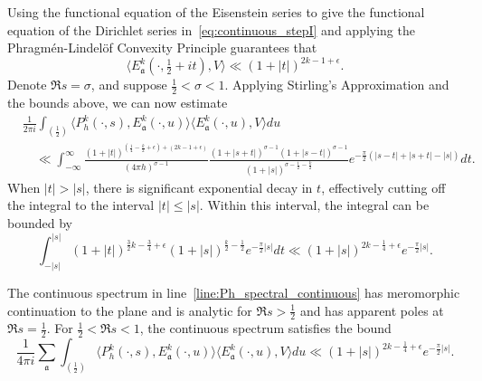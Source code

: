 Using the functional equation of the Eisenstein series to give the functional equation of
the Dirichlet series in~\eqref{eq:continuous_stepI} and applying the Phragm\'en-Lindel\"of
Convexity Principle guarantees that
\begin{equation}
  \langle E_\mathfrak{a}^k(\cdot, \tfrac{1}{2} + it), V \rangle \ll (1 + \lvert t
  \rvert)^{2k - 1 + \epsilon}.
\end{equation}
Denote $\Re s = \sigma$, and suppose $\tfrac{1}{2} < \sigma < 1$.
Applying Stirling's Approximation and the bounds above, we can now estimate
\begin{align}
  &\frac{1}{2\pi i} \int_{(\frac{1}{2})} \langle P_h^k(\cdot, s),
E^k_{\mathfrak{a}}(\cdot, u) \rangle \langle E^k_{\mathfrak{a}}(\cdot, u), V \rangle du \\
  &\quad \ll \int_{-\infty}^\infty
  \frac{(1 + \lvert t \rvert)^{(\frac{1}{4} - \frac{k}{2} + \epsilon) + (2k - 1 +
  \epsilon)}}{(4\pi h)^{\sigma - 1}}
  \frac{(1 + \lvert s + t \rvert)^{\sigma - 1} (1 + \lvert s - t \rvert)^{\sigma - 1}}{(1
  + \lvert s \rvert)^{\sigma - \frac{1}{2} - \frac{k}{2}}}
  e^{-\frac{\pi}{2}(\lvert s - t \rvert + \lvert s + t \rvert - \lvert s \rvert)}dt.
\end{align}
When $\lvert t \rvert > \lvert s \rvert$, there is significant exponential decay in $t$,
effectively cutting off the integral to the interval $\lvert t \rvert \leq \lvert s
\rvert$.
Within this interval, the integral can be bounded by
\begin{equation}
  \int_{-\lvert s \rvert}^{\lvert s \rvert} (1 + \lvert t \rvert)^{\frac{3}{2}k -
  \frac{3}{4} + \epsilon} (1 + \lvert s \rvert)^{\frac{k}{2} - \frac{1}{2}}
  e^{-\frac{\pi}{2}\lvert s \rvert} dt \ll (1 + \lvert s \rvert)^{2k - \frac{1}{4} +
  \epsilon} e^{-\frac{\pi}{2}\lvert s \rvert}.
\end{equation}


\begin{proposition}\label{prop:hyperboloid_continuous_props}
  The continuous spectrum in line~\eqref{line:Ph_spectral_continuous} has meromorphic
  continuation to the plane and is analytic for $\Re s > \frac{1}{2}$ and has apparent
  poles at $\Re s = \frac{1}{2}$.
  For $\frac{1}{2} < \Re s < 1$, the continuous spectrum satisfies the bound
  \begin{equation}
    \frac{1}{4\pi i} \sum_{\mathfrak{a}} \int_{(\frac{1}{2})} \langle P_h^k(\cdot, s),
    E^k_{\mathfrak{a}}(\cdot, u) \rangle \langle E^k_{\mathfrak{a}}(\cdot, u), V \rangle
    du \ll (1 + \lvert s \rvert)^{2k - \frac{1}{4} + \epsilon} e^{-\frac{\pi}{2}\lvert s
    \rvert}.
  \end{equation}
\end{proposition}



